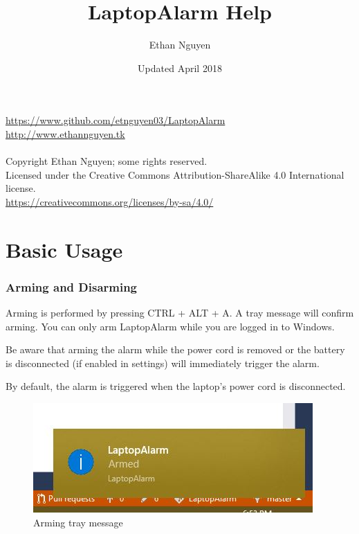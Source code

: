 \documentclass[12pt, letterpaper]{article}
\begin{document}
\begin{titlepage}
\title{LaptopAlarm Help}
\author{Ethan Nguyen}
\date{Updated April 2018}
\maketitle

\vfill

\url{https://www.github.com/etnguyen03/LaptopAlarm} \\
\url{http://www.ethannguyen.tk}
\\
\\
Copyright \textcopyright   Ethan Nguyen; some rights reserved. \\
Licensed under the Creative Commons Attribution-ShareAlike 4.0 International license. \\

\url{https://creativecommons.org/licenses/by-sa/4.0/}

\end{titlepage}

\tableofcontents
\pagebreak

\part{Basic Usage}
\section{Arming and Disarming}
Arming is performed by pressing CTRL + ALT + A. A tray message will confirm arming. You can only arm LaptopAlarm while you are logged in to Windows.

Be aware that arming the alarm while the power cord is removed or the battery is disconnected (if enabled in settings) will immediately trigger the alarm.

By default, the alarm is triggered when the laptop's power cord is disconnected.

\begin{figure}[H]
  \caption{Arming tray message}
  \centering
    \includegraphics{figures/figure01.JPG}
\end{figure}
\end{document}

